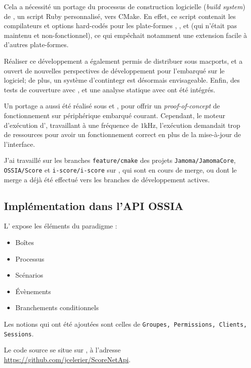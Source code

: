Cela a nécessité un portage du processus de construction logicielle (\textit{build system})  de , un script Ruby personnalisé, vers \gls{CMake}. En effet, ce script contenait les compilateurs et options hard-codés pour les plate-formes , , et  (qui n'était pas maintenu et non-fonctionnel), ce qui empêchait notamment une extension facile à d'autres plate-formes.

Réaliser ce développement a également permis de distribuer  sous \gls{macports}, et a ouvert de nouvelles perspectives de développement pour l'embarqué sur le logiciel; de plus, un système d'\gls{contintegr} est désormais envisageable. Enfin, des tests de couverture avec , et une analyse statique avec  ont été intégrés.

Un portage a aussi été réalisé sous  et , pour offrir un \textit{proof-of-concept} de fonctionnement sur périphérique embarqué courant. Cependant, le moteur d'exécution d', travaillant à une fréquence de $\num{1} \si{\kHz}$, l'exécution demandait trop de ressources pour avoir un fonctionnement correct en plus de la mise-à-jour de l'interface.

J'ai travaillé sur les branches \texttt{feature/cmake} des projets \texttt{Jamoma/JamomaCore}, \texttt{OSSIA/Score} et \texttt{i-score/i-score} sur , qui sont en cours de merge, ou dont le merge a déjà été effectué vers les branches de développement actives.
\subsection{Implémentation dans l'API OSSIA}
L' expose les éléments du paradigme  : 

\begin{itemize}
	\item Boîtes
	\item Processus
	\item Scénarios
	\item Évènements
	\item Branchements conditionnels
\end{itemize}

Les notions qui ont été ajoutées sont celles de \texttt{Groupes, Permissions, Clients, Sessions}.

Le code source se situe sur , à l'adresse \url{https://github.com/jcelerier/ScoreNetApi}.

